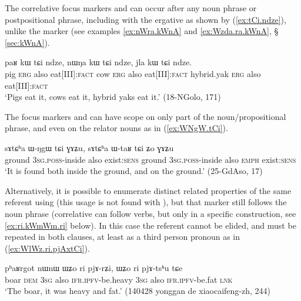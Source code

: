 The correlative focus markers  and  can occur after any noun phrase or postpositional phrase, including with the ergative   as shown by (\ref{ex:tCi.ndze}), unlike the marker  (see examples \ref{ex:nWra.kWnA} and \ref{ex:Wzda.ra.kWnA}, § \ref{sec:kWnA}).
  
  \begin{exe}
\ex \label{ex:tCi.ndze}
 \gll paʁ kɯ tɕi ndze, nɯŋa kɯ tɕi ndze, jla kɯ tɕi ndze.   \\
 pig \textsc{erg} also eat[III]:\textsc{fact}  cow \textsc{erg} also eat[III]:\textsc{fact}  hybrid.yak \textsc{erg} also eat[III]:\textsc{fact}  \\
 \glt `Pigs eat it, cows eat it, hybrid yaks eat it.' (18-NGolo, 171)
  \end{exe}

The focus markers  and  can have scope on only part of the noun/propositional phrase, and even on the relator nouns as in (\ref{ex:WNgW.tCi}).

   \begin{exe}
\ex \label{ex:WNgW.tCi}
 \gll   sɤtɕʰa ɯ-ŋgɯ tɕi ɣɤʑu, sɤtɕʰa ɯ-taʁ tɕi ʑo ɣɤʑu \\
 ground \textsc{3sg}.\textsc{poss}-inside also exist:\textsc{sens}  ground \textsc{3sg}.\textsc{poss}-inside also \textsc{emph} exist:\textsc{sens} \\
 \glt `It is found both inside the ground, and on the ground.' (25-GdAso, 17)
    \end{exe}
    
Alternatively, it is possible to enumerate distinct related properties of the same referent using  (this usage is not found with ), but that marker still follows the noun phrase (correlative  can follow verbs, but only in a specific construction, see \ref{ex:ri.kWmWm.ri} below). In this case the referent cannot be elided, and must be repeated in both clauses, at least as a third person pronoun  as in (\ref{ex:WlWz.ri.pjAxtCi}). 

  \begin{exe}
\ex \label{ex:WlWz.ri.pjArZi}
 \gll pʰaʁrgot nɯnɯ ɯʑo ri pjɤ-rʑi, ɯʑo ri pjɤ-tsʰu tɕe \\
 boar \textsc{dem} \textsc{3sg} also \textsc{ifr}.\textsc{ipfv}-be.heavy \textsc{3sg} also \textsc{ifr}.\textsc{ipfv}-be.fat \textsc{lnk} \\ 
\glt  `The boar, it was heavy and fat.' (140428 yonggan de xiaocaifeng-zh, 244)
 \end{exe}

